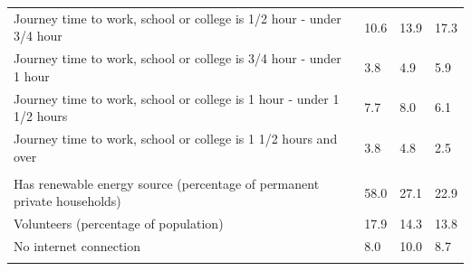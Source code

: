 \documentclass{article}
\begin{document}
\begin{table}[h]
\begin{tabular}{KTTT}
Journey time to work, school or college is 1/2 hour - under 3/4 hour & 10.6& 13.9& 17.3\\
Journey time to work, school or college is 3/4 hour - under 1 hour & 3.8& 4.9& 5.9\\
Journey time to work, school or college is 1 hour - under 1 1/2 hours & 7.7& 8.0& 6.1\\
Journey time to work, school or college is 1 1/2 hours and over & 3.8& 4.8& 2.5\\
\hline
    \\ 
    \hline
Has renewable energy source (percentage of permanent private households) & 58.0& 27.1& 22.9\\
    \hline
Volunteers (percentage of population) & 17.9& 14.3& 13.8\\
    \hline
No internet connection&  8.0& 10.0&  8.7\\
\hline
\end{tabular}
\end{table}
\end{document}
